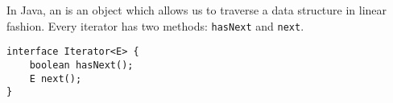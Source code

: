 In Java, an  is an object which allows us to traverse a data
structure in linear fashion. Every iterator has two methods:
\lstinline$hasNext$ and \lstinline$next$.

\begin{lstlisting}
interface Iterator<E> {
    boolean hasNext();
    E next();
}
\end{lstlisting}
